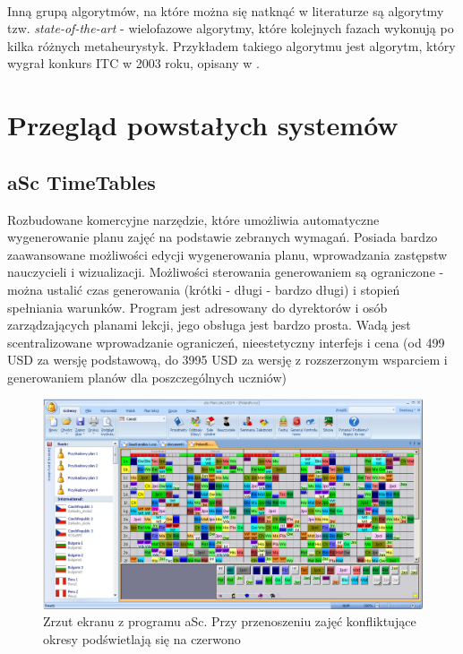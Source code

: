 \paragraph{} Inną grupą algorytmów, na które można się natknąć w literaturze są algorytmy tzw. \textit{state-of-the-art} - wielofazowe algorytmy, które kolejnych fazach wykonują po kilka różnych metaheurystyk. Przykładem takiego algorytmu jest algorytm, który wygrał konkurs ITC w 2003 roku, opisany w \cite{kostuch}.


\section{Przegląd powstałych systemów}



\subsection{aSc TimeTables}
Rozbudowane komercyjne narzędzie, które umożliwia automatyczne wygenerowanie planu zajęć na podstawie zebranych wymagań. Posiada bardzo zaawansowane możliwości edycji wygenerowania planu, wprowadzania zastępstw nauczycieli i wizualizacji. Możliwości sterowania generowaniem są ograniczone - można ustalić czas generowania (krótki - długi - bardzo długi) i stopień spełniania warunków. Program jest adresowany do dyrektorów i osób zarządzających planami lekcji, jego obsługa jest bardzo prosta. Wadą jest scentralizowane wprowadzanie ograniczeń, nieestetyczny interfejs i cena 
(od 499 USD za wersję podstawową, do 3995 USD za wersję z rozszerzonym wsparciem i generowaniem planów dla poszczególnych uczniów)
\begin{figure}[H]
\includegraphics[width=15cm]{img/asc2.png}
\caption{Zrzut ekranu z programu aSc. Przy przenoszeniu zajęć konfliktujące okresy podświetlają się na czerwono}
\end{figure}

